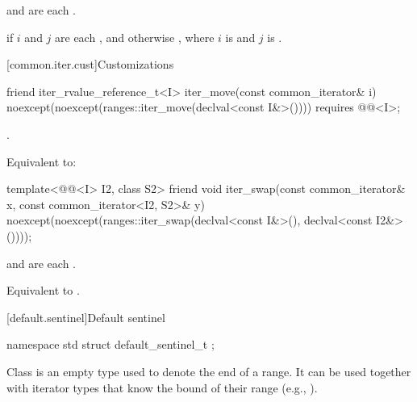 \begin{itemdescr}
\pnum
\expects
{} and 
are each .

\pnum
\returns
{} if $i$ and $j$ are each , and otherwise
, where
$i$ is  and $j$ is .
\end{itemdescr}

[common.iter.cust]{Customizations}

%
\begin{itemdecl}
friend iter_rvalue_reference_t<I> iter_move(const common_iterator& i)
  noexcept(noexcept(ranges::iter_move(declval<const I&>())))
    requires @@<I>;
\end{itemdecl}

\begin{itemdescr}
\pnum
\expects
{}.

\pnum
\effects
Equivalent to: 
\end{itemdescr}

%
\begin{itemdecl}
template<@@<I> I2, class S2>
  friend void iter_swap(const common_iterator& x, const common_iterator<I2, S2>& y)
    noexcept(noexcept(ranges::iter_swap(declval<const I&>(), declval<const I2&>())));
\end{itemdecl}

\begin{itemdescr}
\pnum
\expects
{} and 
are each .

\pnum
\effects
Equivalent to .
\end{itemdescr}

[default.sentinel]{Default sentinel}

%
\begin{itemdecl}
namespace std {
  struct default_sentinel_t { };
}
\end{itemdecl}

\pnum
Class  is an empty type used to denote the end of a
range. It can be used together with iterator types that know the bound
of their range (e.g., ).


